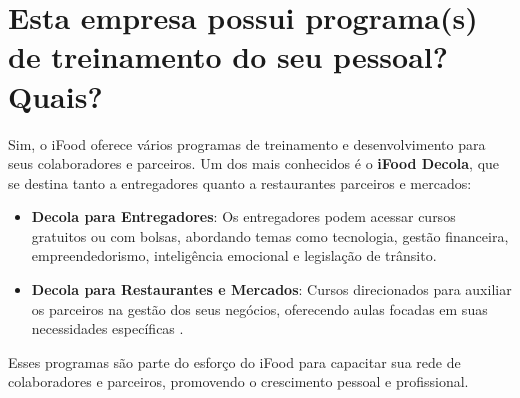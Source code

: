 \section{Esta empresa possui programa(s) de treinamento do seu pessoal? Quais?}

Sim, o iFood oferece vários programas de treinamento e desenvolvimento para seus colaboradores e parceiros. Um dos mais conhecidos é o \textbf{iFood Decola}, que se destina tanto a entregadores quanto a restaurantes parceiros e mercados:

\begin{itemize}
    \item \textbf{Decola para Entregadores}: Os entregadores podem acessar cursos gratuitos ou com bolsas, abordando temas como tecnologia, gestão financeira, empreendedorismo, inteligência emocional e legislação de trânsito.
    \item \textbf{Decola para Restaurantes e Mercados}: Cursos direcionados para auxiliar os parceiros na gestão dos seus negócios, oferecendo aulas focadas em suas necessidades específicas \cite{ifooddecola2023}.
\end{itemize}

Esses programas são parte do esforço do iFood para capacitar sua rede de colaboradores e parceiros, promovendo o crescimento pessoal e profissional.

